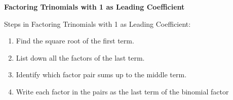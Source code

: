 \begin{center}
\textbf{Factoring Trinomials with 1 as Leading Coefficient}
\end{center}

\vspace*{1ex}

Steps in Factoring Trinomials with 1 as Leading Coefficient: 
\begin{enumerate}
\item Find the square root of the first term.
\item List down all the factors of the last term.
\item Identify which factor pair sums up to the middle term.
\item Write each factor in the pairs as the last term of the binomial factor
\end{enumerate}
